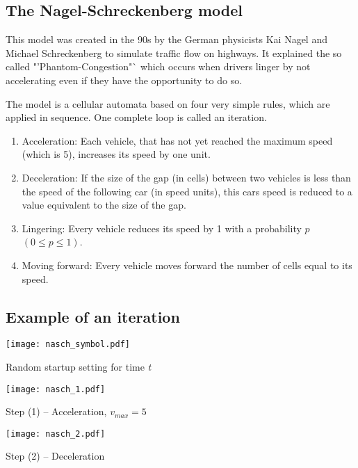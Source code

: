 \subsection{The Nagel-Schreckenberg model}
This model was created in the 90s by the German physicists Kai Nagel and Michael Schreckenberg to simulate 
traffic flow on highways. It explained the so called "'Phantom-Congestion"` which occurs when drivers 
linger by not accelerating even if they have the opportunity to do so.

The model is a cellular automata based on four very simple rules, which are applied in sequence. One complete loop is called an iteration.

\begin{enumerate}
\item Acceleration: Each vehicle, that has not yet reached the maximum speed (which is 5), increases its speed by one unit.
\item Deceleration: If the size of the gap (in cells) between two vehicles is less than the speed of the following car (in speed units), this cars speed is reduced to a value equivalent to the size of the gap.
\item Lingering: Every vehicle reduces its speed by 1 with a probability $p$ $(0 \leq p \leq 1)$.
\item Moving forward: Every vehicle moves forward the number of cells equal to its speed.
\end{enumerate}

\subsection{Example of an iteration}
\texttt{[image: nasch\_symbol.pdf]} \vspace*{1cm}

Random startup setting for time \textit{t}\\ \vspace{-.2cm}

\texttt{[image: nasch\_1.pdf]}\vspace*{1cm}

Step (1) -- Acceleration, $v_{max} = 5$\\ \vspace{-.2cm}

\texttt{[image: nasch\_2.pdf]}\vspace*{1cm}

Step (2) -- Deceleration\\ \vspace{-.2cm}

